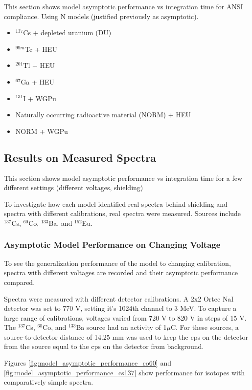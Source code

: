 This section shows model asymptotic performance vs integration time for ANSI compliance. Using N models (justified previously as asymptotic). 


\begin{itemize}
  \item $^{137}$Cs + depleted uranium (DU)
  \item $^{99m}$Tc + HEU
  \item $^{201}$Tl + HEU
  \item $^{67}$Ga + HEU
  \item $^{131}$I + WGPu
  \item Naturally occurring radioactive material (NORM) + HEU
  \item NORM + WGPu
\end{itemize}


\subsection{Results on Measured Spectra}

This section shows model asymptotic performance vs integration time for a few different settings (different voltages, shielding)

To investigate how each model identified real spectra behind shielding and spectra with different calibrations, real spectra were measured. Sources include $^{137}$Cs, $^{60}$Co, $^{133}$Ba, and $^{152}$Eu. 


\subsubsection{Asymptotic Model Performance on Changing Voltage}

To see the generalization performance of the model to changing calibration, spectra with different voltages are recorded and their asymptotic performance compared.

Spectra were measured with different detector calibrations. A 2x2 Ortec NaI detector was set to 770 V, setting it's 1024th channel to 3 MeV. To capture a large range of calibrations, voltages varied from 720 V to 820 V in steps of 15 V. The $^{137}$Cs, $^{60}$Co, and $^{133}$Ba source had an activity of 1$\mu$C. For these sources, a source-to-detector distance of 14.25 mm was used to keep the cps on the detector from the source equal to the cps on the detector from background.

Figures \ref{fig:model_asymptotic_performance_co60} and \ref{fig:model_asymptotic_performance_cs137} show performance for isotopes with comparatively simple spectra.

